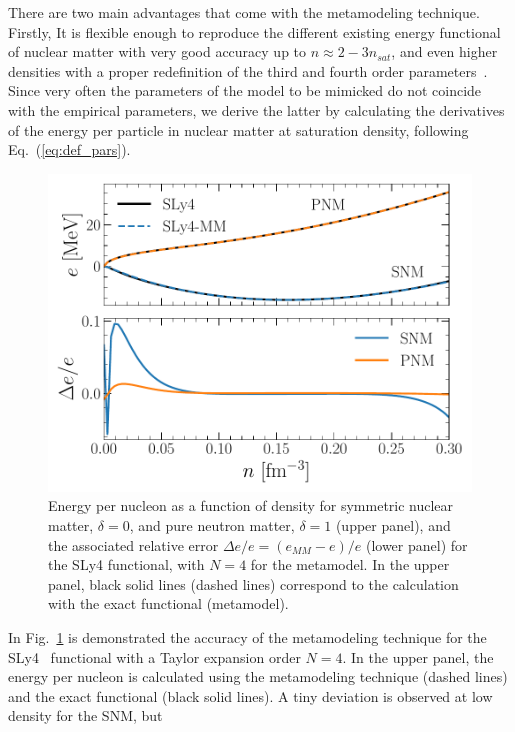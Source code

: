 There are two main advantages that come with the metamodeling technique. 
Firstly, It is flexible enough to reproduce the different existing energy functional of 
nuclear matter with very good accuracy up to $n \approx 2-3n_{sat}$, and even higher
densities with a proper redefinition of the third and fourth order 
parameters~\cite{Margueron2018a}. Since very often the
parameters of the model to be mimicked do not coincide with the empirical
parameters, we derive the latter by calculating the derivatives of the energy 
per particle in nuclear matter at saturation density, following
Eq.~(\ref{eq:def_pars}).
%
\begin{figure}[!t]
\begin{center}
  \includegraphics[width=0.9\linewidth]{figures/mm_accuracy.pdf}
\end{center}
\caption[Accuracy of the metamodeling technique for SLy4]{Energy per 
  nucleon as a function of density for symmetric
  nuclear matter, $\delta=0$, and pure neutron matter, $\delta=1$ (upper panel), and the
associated relative error $\Delta e/e = (e_{MM} - e)/e$ (lower panel) for the SLy4
functional, with $N=4$ for the metamodel. In the upper panel, black solid lines 
(dashed lines) correspond to the
calculation with the exact functional (metamodel).}\label{fig:mm_accuracy}
\end{figure}
%
In Fig.~\ref{fig:mm_accuracy} is demonstrated the accuracy of the metamodeling
technique for the SLy4~\cite{Chabanat1998} functional with a Taylor expansion 
order $N=4$. In the upper panel, the energy per nucleon is calculated 
using the metamodeling technique (dashed lines) and the exact functional (black
solid lines). A tiny deviation is observed at low density for the SNM, but 
